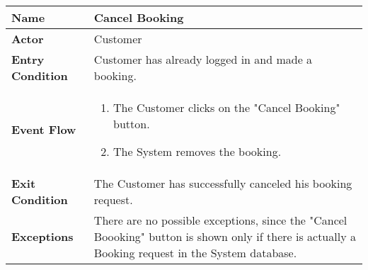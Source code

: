 \begin{center}
    \begin{tabular}{ | l | p{11cm} |}
    \hline
    \textbf{Name} & Cancel Booking \\ \hline
    \textbf{Actor} & Customer \\ \hline
    \textbf{Entry Condition} & Customer has already logged in and made a booking.  \\ \hline
    \textbf{Event Flow} & \begin{enumerate}
					\item The Customer clicks on the "Cancel Booking" button.
					\item The System removes the booking.
		            \end{enumerate}\\  \hline
    \textbf{Exit Condition} & The Customer has successfully canceled his booking request. \\ \hline
    \textbf{Exceptions} & There are no possible exceptions, since the "Cancel Boooking" button is shown only if there is actually a Booking request in the System database.\\  \hline		
    \end{tabular}
\end{center}
